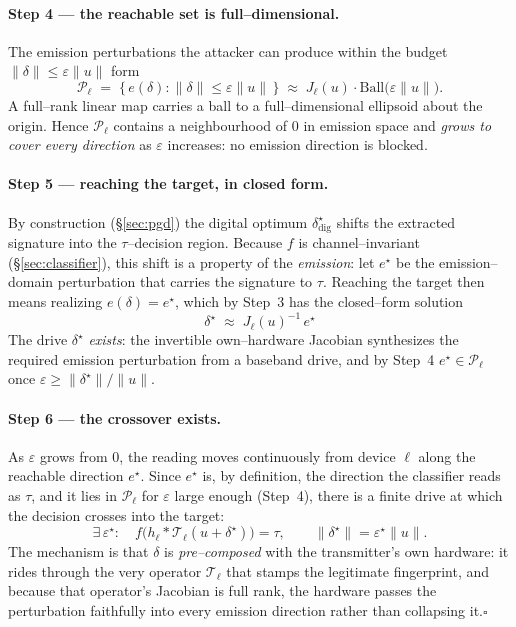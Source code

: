 \documentclass[11pt]{article}
\newcommand{\Top}[1]{\mathcal{T}_{#1}}          %
\begin{document}
\paragraph{Step 4 --- the reachable set is full--dimensional.} The emission perturbations the
attacker can produce within the budget $\|\delta\|\le\varepsilon\|u\|$ form
\begin{equation}
\mathcal{P}_\ell\;=\;\big\{\,e(\delta):\|\delta\|\le\varepsilon\|u\|\,\big\}
\;\approx\;J_\ell(u)\cdot\mathrm{Ball}\!\big(\varepsilon\|u\|\big).
\label{eq:reachset}
\end{equation}
A full--rank linear map carries a ball to a full--dimensional ellipsoid about the origin. Hence
$\mathcal{P}_\ell$ contains a neighbourhood of $0$ in emission space and \emph{grows to cover every
direction} as $\varepsilon$ increases: no emission direction is blocked.

\paragraph{Step 5 --- reaching the target, in closed form.} By construction (\S\ref{sec:pgd}) the
digital optimum $\delta^\star_{\mathrm{dig}}$ shifts the extracted signature into the
$\tau$--decision region. Because $f$ is channel--invariant (\S\ref{sec:classifier}), this shift is a
property of the \emph{emission}: let $e^\star$ be the emission--domain perturbation that carries the
signature to $\tau$. Reaching the target then means realizing $e(\delta)=e^\star$, which by Step~3
has the closed--form solution
\begin{equation}
\boxed{\;\delta^\star\;\approx\;J_\ell(u)^{-1}\,e^\star\;}
\label{eq:sc-inverse}
\end{equation}
The drive $\delta^\star$ \emph{exists}: the invertible own--hardware Jacobian synthesizes the
required emission perturbation from a baseband drive, and by Step~4 $e^\star\in\mathcal{P}_\ell$ once
$\varepsilon\ge\|\delta^\star\|/\|u\|$.

\paragraph{Step 6 --- the crossover exists.} As $\varepsilon$ grows from $0$, the reading moves
continuously from device $\ell$ along the reachable direction $e^\star$. Since $e^\star$ is, by
definition, the direction the classifier reads as $\tau$, and it lies in $\mathcal{P}_\ell$ for
$\varepsilon$ large enough (Step~4), there is a finite drive at which the decision crosses into the
target:
\begin{equation}
\boxed{\;
\exists\,\varepsilon^\star:\quad
f\big(h_\ell*\Top{\ell}(u+\delta^\star)\big)=\tau,
\qquad\|\delta^\star\|=\varepsilon^\star\|u\| .
\;}
\label{eq:reach}
\end{equation}
The mechanism is that $\delta$ is \emph{pre--composed} with the transmitter's own hardware: it
rides through the very operator $\Top{\ell}$ that stamps the legitimate fingerprint, and because
that operator's Jacobian is full rank, the hardware passes the perturbation faithfully into every
emission direction rather than collapsing it.\hfill$\square$
\end{document}
